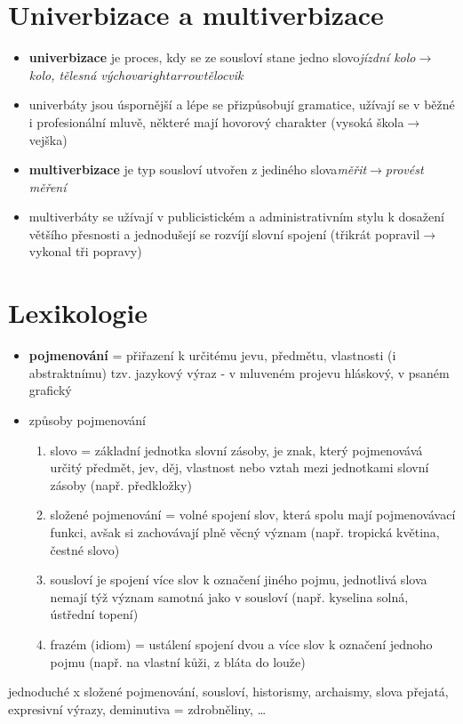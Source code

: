 \documentclass{memoir}
\begin{document}
\section*{Univerbizace a multiverbizace}
	\begin{itemize}
		\item \textbf{univerbizace} je proces, kdy se ze sousloví stane jedno slovo\hfill\textit{jízdní kolo$\rightarrow$kolo, tělesná výchova$rightarrow$tělocvik}
		\item univerbáty jsou úspornější a lépe se přizpůsobují gramatice, užívají se v běžné i profesionální mluvě, některé mají hovorový charakter (vysoká škola$\rightarrow$vejška)
		\item \textbf{multiverbizace} je typ sousloví utvořen z jediného slova\hfill\textit{měřit$\rightarrow$provést měření}
		\item multiverbáty se užívají v publicistickém a administrativním stylu k dosažení většího přesnosti a jednodušejí se rozvíjí slovní spojení (třikrát popravil$\rightarrow$vykonal tři popravy)
	\end{itemize}
	
\section*{Lexikologie}
	\begin{itemize}
		\item \textbf{pojmenování} = přiřazení k určitému jevu, předmětu, vlastnosti (i abstraktnímu) tzv. jazykový výraz - v mluveném projevu hláskový, v psaném grafický
		\item způsoby pojmenování
		\begin{enumerate}
			\item slovo = základní jednotka slovní zásoby, je znak, který pojmenovává určitý předmět, jev, děj, vlastnost nebo vztah mezi jednotkami slovní zásoby (např. předkložky)
			\item složené pojmenování = volné spojení slov, která spolu mají pojmenovávací funkci, avšak si zachovávají plně věcný význam (např. tropická květina, čestné slovo)
			\item sousloví je spojení více slov k označení jiného pojmu, jednotlivá slova nemají týž význam samotná jako v sousloví (např. kyselina solná, ústřední topení)
			\item frazém (idiom) = ustálení spojení dvou a více slov k označení jednoho pojmu (např. na vlastní kůži, z bláta do louže)
		\end{enumerate}
	\end{itemize}
jednoduché x složené pojmenování, sousloví, historismy, archaismy, slova přejatá, expresivní výrazy, deminutiva = zdrobněliny, …
\end{document}
